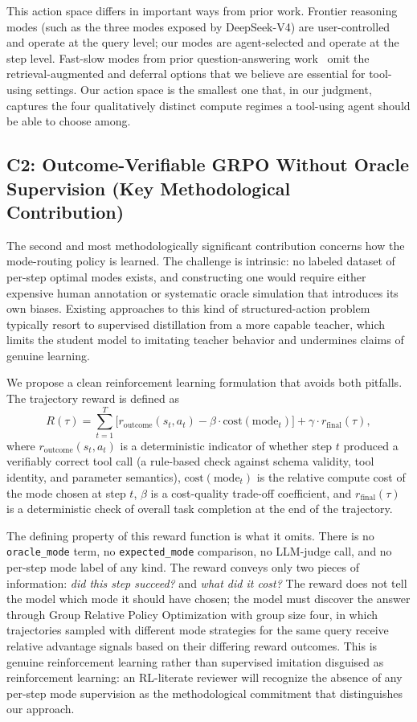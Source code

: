 \documentclass[11pt,a4paper]{article}
\begin{document}
This action space differs in important ways from prior work. Frontier reasoning modes (such as the three modes exposed by DeepSeek-V4) are user-controlled and operate at the query level; our modes are agent-selected and operate at the step level. Fast-slow modes from prior question-answering work~\cite{thinker} omit the retrieval-augmented and deferral options that we believe are essential for tool-using settings. Our action space is the smallest one that, in our judgment, captures the four qualitatively distinct compute regimes a tool-using agent should be able to choose among.

\subsection{C2: Outcome-Verifiable GRPO Without Oracle Supervision (Key Methodological Contribution)}

The second and most methodologically significant contribution concerns how the mode-routing policy is learned. The challenge is intrinsic: no labeled dataset of per-step optimal modes exists, and constructing one would require either expensive human annotation or systematic oracle simulation that introduces its own biases. Existing approaches to this kind of structured-action problem typically resort to supervised distillation from a more capable teacher, which limits the student model to imitating teacher behavior and undermines claims of genuine learning.

We propose a clean reinforcement learning formulation that avoids both pitfalls. The trajectory reward is defined as
\[
R(\tau) = \sum_{t=1}^{T} \bigl[ r_{\text{outcome}}(s_t, a_t) - \beta \cdot \text{cost}(\text{mode}_t) \bigr] + \gamma \cdot r_{\text{final}}(\tau),
\]
where $r_{\text{outcome}}(s_t, a_t)$ is a deterministic indicator of whether step $t$ produced a verifiably correct tool call (a rule-based check against schema validity, tool identity, and parameter semantics), $\text{cost}(\text{mode}_t)$ is the relative compute cost of the mode chosen at step $t$, $\beta$ is a cost-quality trade-off coefficient, and $r_{\text{final}}(\tau)$ is a deterministic check of overall task completion at the end of the trajectory.

The defining property of this reward function is what it omits. There is no \texttt{oracle\_mode} term, no \texttt{expected\_mode} comparison, no LLM-judge call, and no per-step mode label of any kind. The reward conveys only two pieces of information: \textit{did this step succeed?} and \textit{what did it cost?} The reward does not tell the model which mode it should have chosen; the model must discover the answer through Group Relative Policy Optimization with group size four, in which trajectories sampled with different mode strategies for the same query receive relative advantage signals based on their differing reward outcomes. This is genuine reinforcement learning rather than supervised imitation disguised as reinforcement learning: an RL-literate reviewer will recognize the absence of any per-step mode supervision as the methodological commitment that distinguishes our approach.
\end{document}

